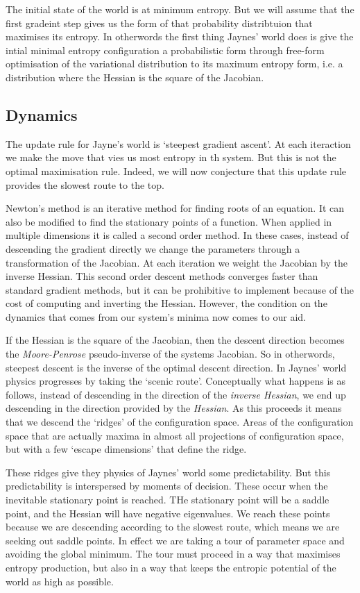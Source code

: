 \documentclass[11pt,a4paper]{article}
\begin{document}
The initial state of the world is at minimum entropy. But we will assume that the first gradeint step gives us the form of that probability distribtuion that maximises its entropy. In otherwords the first thing Jaynes' world does is give the intial minimal entropy configuration a probabilistic form through free-form optimisation of the variational distribution to its maximum entropy form, i.e. a distribution where the Hessian is the square of the Jacobian.

\subsection{Dynamics}

The update rule for Jayne's world is `steepest gradient ascent'. At each iteraction we make the move that vies us most entropy in th system. But this is not the optimal maximisation rule. Indeed, we will now conjecture that this update rule provides the slowest route to the top. 

Newton's method is an iterative method for finding roots of an equation. It can also be modified to find the stationary points of a function. When applied in multiple dimensions it is called a second order method. In these cases, instead of descending the gradient directly we change the parameters through a transformation  of the Jacobian. At each iteration we weight the Jacobian by the inverse Hessian. This second order descent methods converges faster than standard gradient methods, but it can be prohibitive to implement because of the cost of computing and inverting the Hessian. However, the condition on the dynamics that comes from our system's minima now comes to our aid.

If the Hessian is the square of the Jacobian, then the descent direction becomes the \emph{Moore-Penrose} pseudo-inverse of the systems Jacobian. So in otherwords, steepest descent is the inverse of the optimal descent direction. In Jaynes' world physics progresses by taking the `scenic route'. Conceptually what happens is as follows, instead of descending in the direction of the \emph{inverse Hessian}, we end up descending in the direction provided by the \emph{Hessian}. As this proceeds it means that we descend the `ridges' of the configuration space. Areas of the configuration space that are actually maxima in almost all projections of configuration space, but with a few `escape dimensions' that define the ridge. 

These ridges give they physics of Jaynes' world some predictability. But this predictability is interspersed by moments of decision. These occur when the inevitable stationary point is reached. THe stationary point will be a saddle point, and the Hessian will have negative eigenvalues. We reach these points because we are descending according to the slowest route, which means we are seeking out saddle points. In effect we are taking a tour of parameter space and avoiding the global minimum. The tour must proceed in a way that maximises entropy production, but also in a way that keeps the entropic potential of the world as high as possible. 
\end{document}
